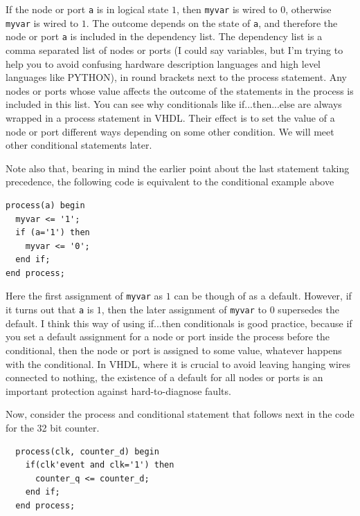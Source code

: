\documentclass[../physical_computing.tex]{subfiles}
\begin{document}
If the node or port \texttt{a} is in logical state $1$, then \texttt{myvar} is wired to $0$, otherwise \texttt{myvar} is wired to $1$. The outcome depends on the state of \texttt{a}, and therefore the node or port \texttt{a} is included in the dependency list. The dependency list is a comma separated list of nodes or ports (I could say variables, but I'm trying to help you to avoid confusing hardware description languages and high level languages like PYTHON), in round brackets next to the process statement. Any nodes or ports whose value affects the outcome of the statements in the process is included in this list. You can see why conditionals like if...then...else are always wrapped in a process statement in VHDL. Their effect is to set the value of a node or port different ways depending on some other condition. We will meet other conditional statements later. 

Note also that, bearing in mind the earlier point about the last statement taking precedence, the following code is equivalent to the conditional example above

\begin{verbatim}
process(a) begin
  myvar <= '1';
  if (a='1') then
    myvar <= '0'; 
  end if;
end process;
\end{verbatim}

Here the first assignment of \texttt{myvar} as $1$ can be though of as a default. However, if it turns out that \texttt{a} is $1$, then the later assignment of \texttt{myvar} to $0$ supersedes the default. I think this way of using if...then conditionals is good practice, because if you set a default assignment for a node or port inside the process before the conditional, then the node or port is assigned to some value, whatever happens with the conditional. In VHDL, where it is crucial to avoid leaving hanging wires connected to nothing, the existence of a default for all nodes or ports is an important protection against hard-to-diagnose faults.

Now, consider the process and conditional statement that follows next in the code for the 32 bit counter.

\begin{verbatim}
  process(clk, counter_d) begin
    if(clk'event and clk='1') then
      counter_q <= counter_d;
    end if;
  end process;
\end{verbatim}
\end{document}
